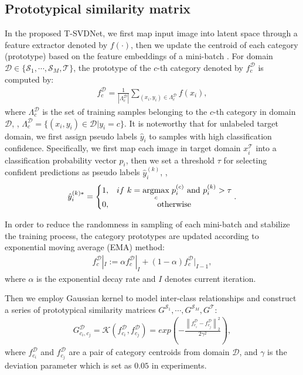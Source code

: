 \documentclass[10pt,twocolumn,letterpaper]{article}
\begin{document}
\subsection{Prototypical similarity matrix}
\label{sec3.1}
In the proposed T-SVDNet, we first map input image into latent space through a feature extractor denoted by $f(\cdot)$, then we update the centroid of each category (prototype) based on the feature embeddings of a mini-batch \cite{pan2019transferrable,xie2018learning,wang2020learning}. For domain ${\mathcal{D}}\in \{\mathcal{S}_1, \cdots, \mathcal{S}_M, \mathcal{T}\}$, the prototype of the $c$-th category denoted by $f_c^{\mathcal{D}}$ is computed by: 
\begin{align}
	f_{c}^{{\mathcal{D}}}=\frac{1}{\left | {\Lambda}_{c}^{{\mathcal{D}}} \right |}\sum_{(x_i, y_i)\in {\Lambda}_{c}^{{\mathcal{D}}}} f(x_{i}),
\end{align} 
where ${\Lambda}_{c}^{{\mathcal{D}}}$ is the set of training samples belonging to the $c$-th category in domain ${\mathcal{D}}$, \ie, ${\Lambda}_{c}^{{\mathcal{D}}} = \{(x_i, y_i)\in {\mathcal{D}}|y_{i} = c \}$. It is noteworthy that for unlabeled target domain, we first assign pseudo labels $\hat{y}_i$ to samples with high classification confidence. Specifically, we first map each image in target domain $x_i^{\mathcal{T}}$ into a classification probability vector $p_i$, then we set a threshold $\tau$ for selecting confident predictions as pseudo labels $\hat{y}_i^{(k)}$, \ie,
\begin{align}
	\hat{y}_i^{(k)*}=\left\{\begin{matrix}
		1, & if\ k=\underset{c}{\rm argmax}\;p_i^{(c)}\ {\rm and}\ p_i^{(k)}>\tau\\ 
		0, & {\rm otherwise}
	\end{matrix}\right..
\end{align}
\par
In order to reduce the randomness in sampling of each mini-batch and stabilize the training process, the category prototypes are updated according to exponential moving average (EMA) method:
\begin{align}
	f_{c}^{\mathcal{D}}|_I:=\alpha f_{c}^{\mathcal{D}}|_I+(1-\alpha)f_{c}^{\mathcal{D}}|_{I-1},
\end{align}
where $\alpha$ is the exponential decay rate and $I$ denotes current iteration. \par
Then we employ Gaussian kernel to model inter-class relationships and construct a series of prototypical similarity matrices ${G}^{\mathcal{S}_1},\cdots, {G}^{\mathcal{S}_M}, {G}^{\mathcal{T}}$: 
\begin{align}
	G_{c_i,c_j}^{\mathcal{D}}={\mathcal{K}}(f_{c_i}^{\mathcal{D}}, f_{c_j}^{\mathcal{D}}) = exp(-\frac{\left \|f_{c_i}^{\mathcal{D}}-f_{c_j}^{\mathcal{D}} \right \|_{2}^{2}}{2{\gamma}^2}),
\end{align}  
where $f_{c_i}^{\mathcal{D}}$ and $f_{c_j}^{\mathcal{D}}$ are a pair of category centroids from domain $\mathcal{D}$, and $\gamma$ is the deviation parameter which is set as $0.05$ in experiments.\par 
\end{document}
